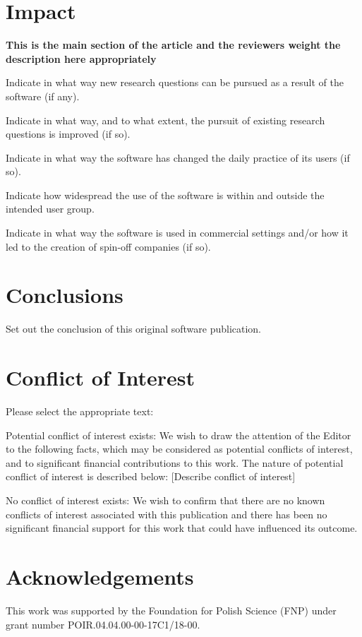 \documentclass[preprint,12pt, a4paper]{elsarticle}
\newcommand{\1}{{\rm 1\hspace{-0.9mm}l}}
\begin{document}
\section{Impact }


\textbf{This is the main section of the article and the reviewers weight the 
description here appropriately}

Indicate in what way new research questions can be pursued as a result of the 
software (if any).

Indicate in what way, and to what extent, the pursuit of existing research 
questions is improved (if so).

Indicate in what way the software has changed the daily practice of its users 
(if so).

Indicate how widespread the use of the software is within and outside the 
intended user group.

Indicate in what way the software is used in commercial settings and/or how it 
led to the creation of spin-off companies (if so).

\section{Conclusions}
\label{}

Set out the conclusion of this original software publication.

\section{Conflict of Interest}
Please select the appropriate text:

Potential conflict of interest exists:
We wish to draw the attention of the Editor to the following facts, which may 
be considered as potential conflicts of interest, and to significant financial 
contributions to this work. The nature of potential conflict of interest is 
described below: [Describe conflict of interest]

No conflict of interest exists:
We wish to confirm that there are no known conflicts of interest associated 
with this publication and there has been no significant financial support for 
this work that could have influenced its outcome.


\section*{Acknowledgements}

This work was supported by the Foundation for Polish Science (FNP) under grant
number POIR.04.04.00-00-17C1/18-00.
\end{document}
